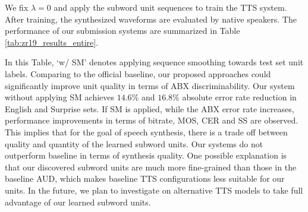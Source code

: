 \documentclass[a4paper]{article}
\begin{document}
We fix $\lambda=0$ and apply the subword unit sequences  to train the TTS system. After training, the synthesized waveforms are evaluated by native speakers. The performance of our submission systems are summarized in Table \ref{tab:zr19_results_entire}. 
\begin{table}[h]
\renewcommand\arraystretch{0.6}
\centering
\caption{Comparison of our submission systems and baseline}
\label{tab:zr19_results_entire}
\end{table}
In this Table, `w/ SM' denotes applying sequence smoothing   towards test set unit labels. Comparing to the official baseline, our proposed approaches could significantly improve  unit quality in terms of ABX discriminability. Our system without applying SM achieves $14.6\%$ and $16.8\%$ absolute error rate reduction in English and Surprise sets. If SM is applied, while the ABX error rate increases, performance improvements in terms of bitrate, MOS, CER and SS are observed. This implies that for the goal of speech synthesis, there is a trade off between quality and quantity of the  learned subword units. Our systems do not outperform baseline in terms of synthesis quality. One possible explanation is that our discovered subword units are much more fine-grained than those in the baseline AUD, which makes baseline TTS configurations less suitable for our units. In the future, we plan to investigate on alternative TTS models to take full advantage of our learned subword units.
\end{document}
